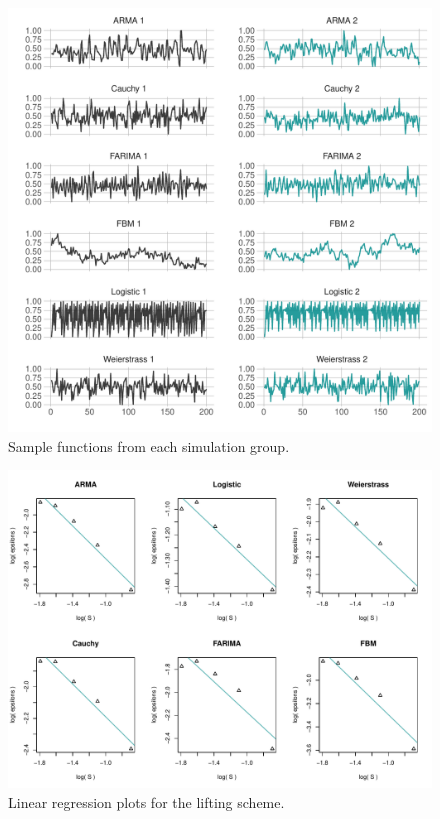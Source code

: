 \begin{figure}[!htbp]
  \begin{center}
  \includegraphics[width = \textwidth, keepaspectratio]{./figs/sim_jitter_plot_jitter_timeseries.pdf}
  \end{center} 
  \caption{Sample functions from each simulation group.  }
   \label{fig:jitter-ts}
\end{figure}


\begin{figure}[!htbp]
  \begin{center}
  \includegraphics[width = \textwidth, keepaspectratio]{./figs/sim_jitter_plot-sim-fits.pdf}
  \end{center} 
  \caption{Linear regression plots for the lifting scheme.}
  \label{fig:lift-lm}
\end{figure}

